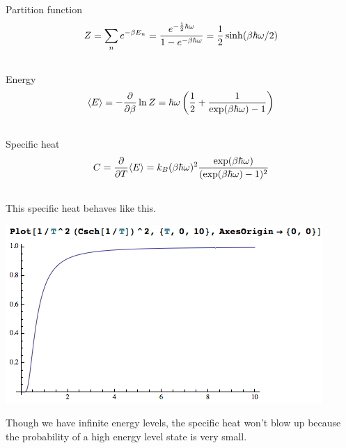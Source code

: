 \documentclass[letterpaper,10pt,english]{sphinxmanual}
\begin{document}
Partition function
\begin{gather}
\begin{split}Z = \sum_n e^{-\beta E_n} = \frac{e^{-\frac{1}{2} \hbar \omega }} { 1 - e^{- \beta \hbar \omega} } = \frac{1}{2}  \sinh(\beta \hbar \omega/2)\end{split}\notag\\\begin{split}\end{split}\notag
\end{gather}
Energy
\begin{gather}
\begin{split}\langle E \rangle = -\frac{\partial}{\partial\beta} \ln Z =  \hbar \omega \left( \frac{1}{2} + \frac{1}{\exp(\beta\hbar\omega) - 1} \right)\end{split}\notag\\\begin{split}\end{split}\notag
\end{gather}
Specific heat
\begin{gather}
\begin{split}C = \frac{\partial}{\partial T} \langle E\rangle = k_B (\beta \hbar \omega)^2 \frac{\exp(\beta \hbar \omega)}{ (\exp(\beta \hbar \omega) - 1)^2 }\end{split}\notag\\\begin{split}\end{split}\notag
\end{gather}
This specific heat behaves like this.

{\hfill\includegraphics{shQHO.png}\hfill}

Though we have infinite energy levels, the specific heat won't blow up because the probability of a high energy level state is very small.
\end{document}
